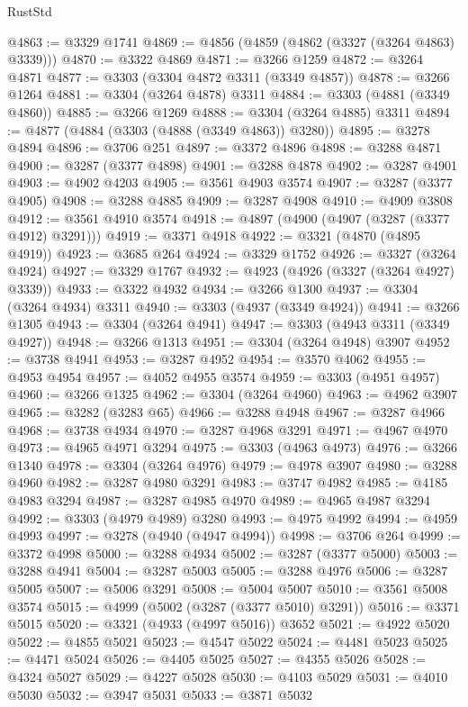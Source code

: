 \begin{lexlean}{RustStd}
\begin{coremodule}
@4863 := @3329 @1741
@4869 := @4856 (@4859 (@4862 (@3327 (@3264 @4863) @3339)))
@4870 := @3322 @4869
@4871 := @3266 @1259
@4872 := @3264 @4871
@4877 := @3303 (@3304 @4872 @3311 (@3349 @4857))
@4878 := @3266 @1264
@4881 := @3304 (@3264 @4878) @3311
@4884 := @3303 (@4881 (@3349 @4860))
@4885 := @3266 @1269
@4888 := @3304 (@3264 @4885) @3311
@4894 := @4877 (@4884 (@3303 (@4888 (@3349 @4863)) @3280))
@4895 := @3278 @4894
@4896 := @3706 @251
@4897 := @3372 @4896
@4898 := @3288 @4871
@4900 := @3287 (@3377 @4898)
@4901 := @3288 @4878
@4902 := @3287 @4901
@4903 := @4902 @4203
@4905 := @3561 @4903 @3574
@4907 := @3287 (@3377 @4905)
@4908 := @3288 @4885
@4909 := @3287 @4908
@4910 := @4909 @3808
@4912 := @3561 @4910 @3574
@4918 := @4897 (@4900 (@4907 (@3287 (@3377 @4912) @3291)))
@4919 := @3371 @4918
@4922 := @3321 (@4870 (@4895 @4919))
@4923 := @3685 @264
@4924 := @3329 @1752
@4926 := @3327 (@3264 @4924)
@4927 := @3329 @1767
@4932 := @4923 (@4926 (@3327 (@3264 @4927) @3339))
@4933 := @3322 @4932
@4934 := @3266 @1300
@4937 := @3304 (@3264 @4934) @3311
@4940 := @3303 (@4937 (@3349 @4924))
@4941 := @3266 @1305
@4943 := @3304 (@3264 @4941)
@4947 := @3303 (@4943 @3311 (@3349 @4927))
@4948 := @3266 @1313
@4951 := @3304 (@3264 @4948) @3907
@4952 := @3738 @4941
@4953 := @3287 @4952
@4954 := @3570 @4062
@4955 := @4953 @4954
@4957 := @4052 @4955 @3574
@4959 := @3303 (@4951 @4957)
@4960 := @3266 @1325
@4962 := @3304 (@3264 @4960)
@4963 := @4962 @3907
@4965 := @3282 (@3283 @65)
@4966 := @3288 @4948
@4967 := @3287 @4966
@4968 := @3738 @4934
@4970 := @3287 @4968 @3291
@4971 := @4967 @4970
@4973 := @4965 @4971 @3294
@4975 := @3303 (@4963 @4973)
@4976 := @3266 @1340
@4978 := @3304 (@3264 @4976)
@4979 := @4978 @3907
@4980 := @3288 @4960
@4982 := @3287 @4980 @3291
@4983 := @3747 @4982
@4985 := @4185 @4983 @3294
@4987 := @3287 @4985 @4970
@4989 := @4965 @4987 @3294
@4992 := @3303 (@4979 @4989) @3280
@4993 := @4975 @4992
@4994 := @4959 @4993
@4997 := @3278 (@4940 (@4947 @4994))
@4998 := @3706 @264
@4999 := @3372 @4998
@5000 := @3288 @4934
@5002 := @3287 (@3377 @5000)
@5003 := @3288 @4941
@5004 := @3287 @5003
@5005 := @3288 @4976
@5006 := @3287 @5005
@5007 := @5006 @3291
@5008 := @5004 @5007
@5010 := @3561 @5008 @3574
@5015 := @4999 (@5002 (@3287 (@3377 @5010) @3291))
@5016 := @3371 @5015
@5020 := @3321 (@4933 (@4997 @5016)) @3652
@5021 := @4922 @5020
@5022 := @4855 @5021
@5023 := @4547 @5022
@5024 := @4481 @5023
@5025 := @4471 @5024
@5026 := @4405 @5025
@5027 := @4355 @5026
@5028 := @4324 @5027
@5029 := @4227 @5028
@5030 := @4103 @5029
@5031 := @4010 @5030
@5032 := @3947 @5031
@5033 := @3871 @5032

\end{coremodule}
\end{lexlean}
